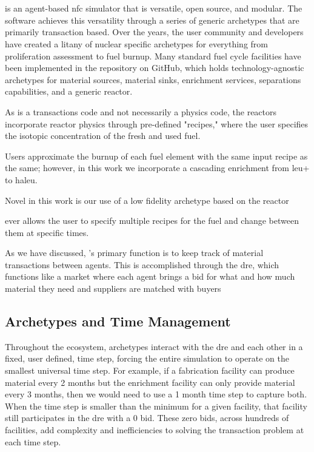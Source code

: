 \section{\cyclus}
\label{sec:cyclus}
\cyclus is an agent-based \gls{nfc} simulator that is versatile, open source, and modular. The software achieves this versatility through a series of generic archetypes that are primarily transaction based. Over the years, the user community and developers have created a litany of nuclear specific archetypes for everything from proliferation assessment to fuel burnup. Many standard fuel cycle facilities have been implemented in the \cycamore repository on GitHub, which holds technology-agnostic archetypes for material sources, material sinks, enrichment services, separations capabilities, and a generic reactor.

As \cyclus is a transactions code and not necessarily a physics code,
the reactors incorporate reactor physics through pre-defined "recipes,"
where the user specifies the isotopic concentration of the fresh and
used fuel.

Users approximate the burnup of each fuel element with the
same input recipe as the same; however, in this work we incorporate a
cascading enrichment from \gls{leu+} to \gls{haleu}.

Novel in this work is our use of a low fidelity archetype based on the
\cycamore reactor %

\gls{ever} allows the user to specify multiple recipes for the fuel and
change between them at specific times.


As we have discussed, \cyclus's primary function is to keep track of
material transactions between agents. This is accomplished through the
\gls{dre}, which functions like a market where each agent brings a bid
for what and how much material they need and suppliers are matched with
buyers %


\subsection{Archetypes and Time Management}
\label{sec:archetypes_and_time_management}

Throughout the \cyclus ecosystem, archetypes interact with the \gls{dre} and each other in a fixed, user defined, time step, forcing the entire simulation to operate on the smallest universal time step. For example, if a fabrication facility can produce material every 2 months but the enrichment facility can only provide material every 3 months, then we would need to use a 1 month time step to capture both. When the time step is smaller than the minimum for a given facility, that facility still participates in the \gls{dre} with a 0 bid. These zero bids, across hundreds of facilities, add complexity and inefficiencies to solving the transaction problem at each time step.

